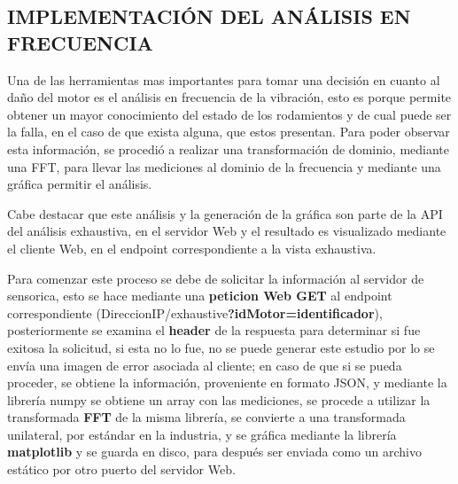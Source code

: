 
\subsection{IMPLEMENTACIÓN DEL ANÁLISIS EN FRECUENCIA}

Una de las herramientas mas importantes para tomar una decisión en cuanto
al daño del motor es el análisis en frecuencia de la vibración, esto es porque
permite obtener un mayor conocimiento del estado de los rodamientos y de cual
puede ser la falla, en el caso de que exista alguna, que estos presentan. Para
poder observar esta información, se procedió a realizar una transformación de
dominio, mediante una FFT, para llevar las mediciones al dominio de la frecuencia
y mediante una gráfica permitir el análisis.

Cabe destacar que este análisis y la generación de la gráfica son parte de la
API del análisis exhaustiva, en el servidor Web y el resultado es visualizado
mediante el cliente Web, en el endpoint correspondiente a la vista exhaustiva.

Para comenzar este proceso se debe de solicitar la información al servidor de
sensorica, esto se hace mediante una \textbf{peticion Web GET} al endpoint
correspondiente (DireccionIP/exhaustive\textbf{?idMotor=identificador}), posteriormente
se examina el \textbf{header} de la respuesta para determinar si fue exitosa
la solicitud, si esta no lo fue, no se puede generar este estudio por lo se envía una
imagen de error asociada al cliente; en caso de que si se pueda proceder, se
obtiene la información, proveniente en formato JSON, y mediante la librería
numpy se obtiene un array con las mediciones, se procede a utilizar la transformada
\textbf{FFT} de la misma librería, se convierte a una transformada unilateral,
por estándar en la industria, y se gráfica mediante la librería \textbf{matplotlib}
y se guarda en disco, para después ser enviada como un archivo estático por otro
puerto del servidor Web.
